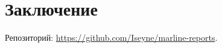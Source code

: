 \documentclass[a4paper]{article}
\begin{document}

\section{Заключение}





Репозиторий: \url{https://github.com/Iseyne/marline-reports}.

\end{document}
